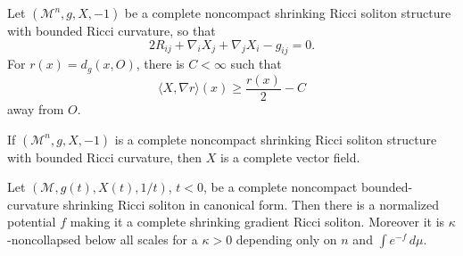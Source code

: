 \begin{lemma}
\label{lem:chow-iv-shrinker-vector-field-radial-bound}
Let \((\mathcal M^n,g,X,-1)\) be a complete noncompact shrinking Ricci
soliton structure with bounded Ricci curvature, so that
\[
 2R_{ij}+\nabla_iX_j+\nabla_jX_i-g_{ij}=0.
\]
For \(r(x)=d_g(x,O)\), there is \(C<\infty\) such that
\[
 \langle X,\nabla r\rangle(x)\geq\frac{r(x)}2-C
\]
away from \(O\).
\end{lemma}

\begin{lemma}
\label{lem:chow-iv-shrinker-vector-field-complete}
If \((\mathcal M^n,g,X,-1)\) is a complete noncompact shrinking Ricci
soliton structure with bounded Ricci curvature, then \(X\) is a complete
vector field.
\end{lemma}

\begin{theorem}
\label{thm:chow-iv-bounded-curvature-shrinker-gradient-noncollapsed}
Let \((\mathcal M,g(t),X(t),1/t)\), \(t<0\), be a complete noncompact
bounded-curvature shrinking Ricci soliton in canonical form.  Then there is a
normalized potential \(f\) making it a complete shrinking gradient Ricci
soliton.  Moreover it is \(\kappa\)-noncollapsed below all scales for a
\(\kappa>0\) depending only on \(n\) and \(\int e^{-f}\,d\mu\).
\end{theorem}
